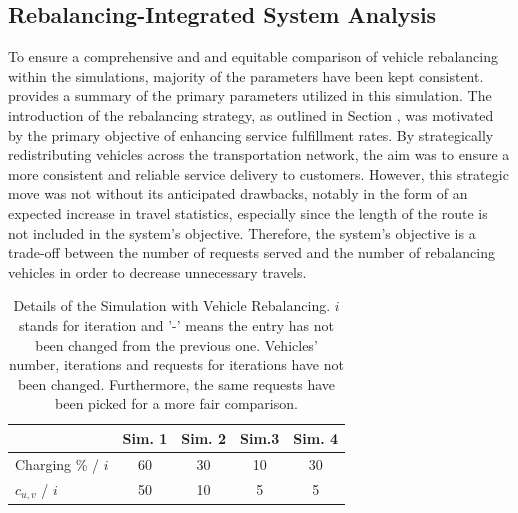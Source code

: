 \subsection{Rebalancing-Integrated System Analysis}
To ensure a comprehensive and and equitable comparison of vehicle rebalancing within the simulations, majority of the parameters have been kept consistent.  provides a summary of the primary parameters utilized in this simulation. The introduction of the rebalancing strategy, as outlined in Section , was motivated by the primary objective of enhancing service fulfillment rates. By strategically redistributing vehicles across the transportation network, the aim was to ensure a more consistent and reliable service delivery to customers. However, this strategic move was not without its anticipated drawbacks, notably in the form of an expected increase in travel statistics, especially since the length of the route is not included in the system's objective. Therefore, the system's objective is a trade-off between the number of requests served and the number of rebalancing vehicles in order to decrease unnecessary travels. \\
\begin{table}[h]
	\centering
	\begin{tabular}{ |l| c|c|c|c|}
		\hline
		&Sim. 1 & Sim. 2& Sim.3&Sim. 4\\
		\hline
		Charging \% / $i$ & 60&30&10&30\\
		$c_{u,v}$  / $i$ & 50&10&5&5\\
	\end{tabular}
	\caption[Details of the Simulation with Vehicle Rebalancing]{Details of the Simulation with Vehicle Rebalancing. $i$ stands for iteration and '-' means the entry has not been changed from the previous one. Vehicles' number, iterations and requests for iterations have not been changed. Furthermore, the same requests have been picked for a more fair comparison.}
	\label{tab:rebalancing_with_simu}   
\end{table} 

